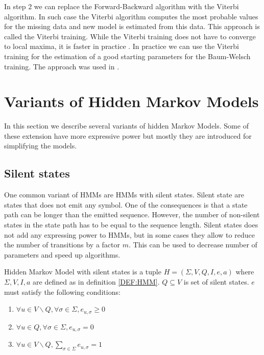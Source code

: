 In step $2$ we can replace the Forward-Backward algorithm with the Viterbi
algorithm. In such case the Viterbi algorithm computes the most probable values
for the missing data and new model is estimated from this data.
This approach is called the Viterbi training.  While the Viterbi training does
not have to converge to local maxima, it is faster in practice
\cite{Durbin1998}.  In practice we can use the Viterbi training for the
estimation of a good starting parameters for the Baum-Welsch training. The
approach was used in \cite{FEAST2011}.

\section{Variants of Hidden Markov Models}

In this section we describe several variants of hidden Markov Models.
Some of these extension have more expressive power but mostly they are
introduced for simplifying the models.

\subsection{Silent states}

One common variant of HMMs are HMMs with silent states. Silent state are states
that does not emit any symbol. One of the consequences is  that a state path can
be longer than the emitted sequence. However, the number of non-silent states in
the state path has to be equal to the sequence length. Silent states does not
add any expressing power to HMMs, but in some cases they allow to reduce the
number of transitions by a factor $m$. This can be used to decrease number of
parameters and speed up algorithms. 

\begin{definition}
Hidden Markov Model with silent states is a
tuple $H=(\Sigma,V,Q,I,e,a)$
where $\Sigma,V,I,a$ are defined as in definition \ref{DEF:HMM}. $Q\subseteq V$ is set of
silent states. $e$ must satisfy the following conditions:
\begin{enumerate}
\item $\forall u\in V\backslash Q,\forall \sigma\in\Sigma, e_{u,\sigma}\geq0$
\item $\forall u\in Q,\forall \sigma\in\Sigma, e_{u,\sigma}=0$
\item $\forall u\in V\backslash Q, \sum_{\sigma\in \Sigma}e_{u,\sigma}=1$
\end{enumerate}
\end{definition}


